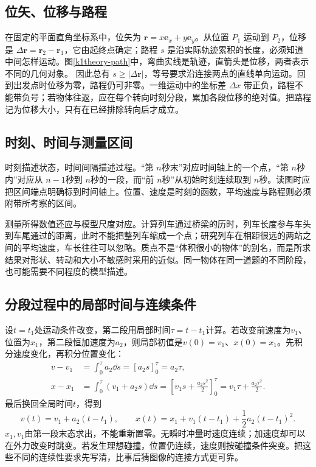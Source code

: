 \subsection{位矢、位移与路程}
在固定的平面直角坐标系中，位矢为 $\bm r=x\bm e_x+y\bm e_y$。从位置 $P_1$ 运动到 $P_2$，位移是 $\Delta\bm r=\bm r_2-\bm r_1$，它由起终点确定；路程 $s$ 是沿实际轨迹累积的长度，必须知道中间怎样运动。图\ref{k1theory-path}中，弯曲实线是轨迹，直箭头是位移，两者表示不同的几何对象。
因此总有 $s\ge|\Delta\bm r|$，等号要求沿连接两点的直线单向运动。回到出发点时位移为零，路程仍可非零。一维运动中的坐标差 $\Delta x$ 带正负，路程不能带负号；若物体往返，应在每个转向时刻分段，累加各段位移的绝对值。把路程记为位移大小，只有在已经排除转向后才成立。

\subsection{时刻、时间与测量区间}
时刻描述状态，时间间隔描述过程。“第 $n$秒末”对应时间轴上的一个点，“第 $n$秒内”对应从 $n-1$秒到 $n$秒的一段，而“前 $n$秒”从初始时刻连续取到 $n$秒。读图时应把区间端点明确标到时间轴上。位置、速度是时刻的函数，平均速度与路程则必须附带所考察的区间。

测量所得数值还应与模型尺度对应。计算列车通过桥梁的历时，列车长度参与车头到车尾通过的距离，此时不能把整列车缩成一个点；研究列车在相距很远的两站之间的平均速度，车长往往可以忽略。质点不是“体积很小的物体”的别名，而是所求结果对形状、转动和大小不敏感时采用的近似。同一物体在同一道题的不同阶段，也可能需要不同程度的模型描述。

\subsection{分段过程中的局部时间与连续条件}
设$t=t_1$处运动条件改变，第二段用局部时间$\tau=t-t_1$计算。若改变前速度为$v_1$、位置为$x_1$，第二段恒加速度为$a_2$，则局部初值是$v(0)=v_1$、$x(0)=x_1$。先积分速度变化，再积分位置变化：
\begin{align*}
v-v_1&=\int_0^\tau a_2\dd s=[a_2s]_0^\tau=a_2\tau,\\
x-x_1&=\int_0^\tau(v_1+a_2s)\dd s
=\left[v_1s+\frac{a_2s^2}{2}\right]_0^\tau
=v_1\tau+\frac{a_2\tau^2}{2}.
\end{align*}
最后换回全局时间$t$，得到
\[v(t)=v_1+a_2(t-t_1),\qquad
x(t)=x_1+v_1(t-t_1)+\frac12a_2(t-t_1)^2.\]
$x_1,v_1$由第一段末态求出，不能重新置零。无瞬时冲量时速度连续；加速度却可以在外力改变时跳变。若发生理想碰撞，位置仍连续，速度则按碰撞条件突变。把这些不同的连续性要求先写清，比事后猜图像的连接方式更可靠。

